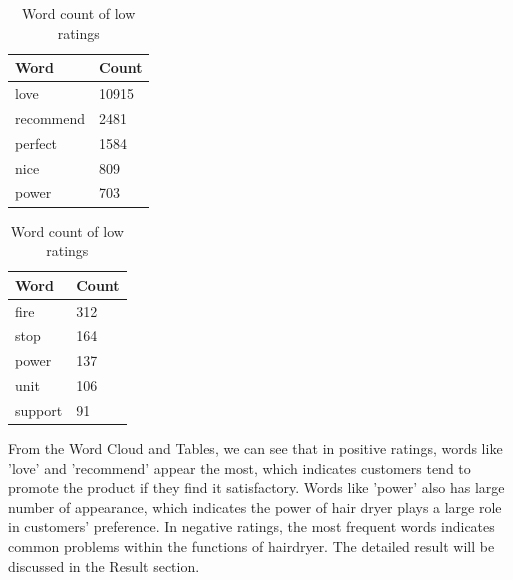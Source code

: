 \documentclass[12pt]{article}
\begin{document}
\begin{table}[!htb]
    \begin{minipage}{.5\linewidth}
      \centering
        \begin{tabular}{ll}
        \hline
            Word & Count \\
            \hline
            love & 10915\\
            \hline
            recommend & 2481\\
            \hline
            perfect & 1584\\
            \hline
            nice & 809\\
            \hline
            power & 703\\
            \hline
        \end{tabular}
        \caption{Word count of high ratings}
    \end{minipage}%
    \begin{minipage}{.5\linewidth}
      \centering
               \begin{tabular}{ll}
        \hline
            Word & Count \\
            \hline
            fire & 312\\
            \hline
            stop & 164\\
            \hline
            power & 137\\
            \hline
            unit & 106\\
            \hline
            support & 91\\
            \hline
        \end{tabular}
        \caption{Word count of low ratings}
    \end{minipage} 
\end{table}

From the Word Cloud and Tables, we can see that in positive ratings, words like 'love' and 'recommend' appear the most, which indicates customers tend to promote the product if they find it satisfactory. Words like 'power' also has large number of appearance, which indicates the power of hair dryer plays a large role in customers' preference. In negative ratings, the most frequent words indicates common problems within the functions of hairdryer. The detailed result will be discussed in the Result section.
\end{document}
